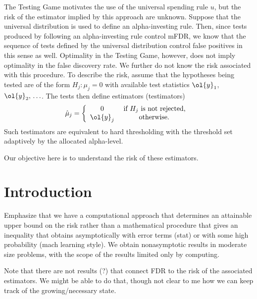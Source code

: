 \documentclass[12pt]{article}
\begin{document}
 The Testing Game motivates the use of the universal spending rule $u$, but the
 risk of the estimator implied by this approach are unknown.  Suppose that the
 universal distribution is used to define an alpha-investing rule.  Then, since
 tests produced by following an alpha-investing rule control mFDR, we know that
 the sequence of tests defined by the universal distribution control false
 positives in this sense as well.  Optimality in the Testing Game, however, does
 not imply optimality in the false discovery rate.  We further do not know the
 risk associated with this procedure.  To describe the risk, assume that the
 hypotheses being tested are of the form $H_j: \mu_j = 0$ with available test
 statistics $\ol{y}_1$, $\ol{y}_2, \,\ldots$.  The tests then define estimators
 (testimators)
 \begin{equation}
    \hat\mu_j = \left\{ 
       \begin{array}{cc}
           0         & \mbox { if $H_j$ is not rejected, }    \cr
           \ol{y}_j  & \mbox { otherwise. } 
       \end{array}  \right.
 \label{eq:muhat}
 \end{equation}
 Such testimators are equivalent to hard thresholding with the threshold set
 adaptively by the allocated alpha-level.

 
 Our objective here is to understand the risk of these estimators.


\clearpage



\section{Introduction}


 Emphasize that we have a computational approach that determines an attainable
 upper bound on the risk rather than a mathematical procedure that gives an
 inequality that obtains asymptotically with error terms (stat) or with some
 high probability (mach learning style).  We obtain nonasymptotic results in
 moderate size problems, with the scope of the results limited only by
 computing.


 Note that there are not results (?) that connect FDR to the risk of the
 associated estimators.  We might be able to do that, though not clear to me how
 we can keep track of the growing/necessary state.
\end{document}
